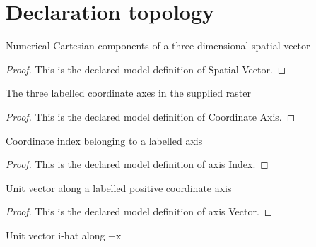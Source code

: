 \section{Declaration topology}
\begin{definition}
  \label{def:physics:phyx-mini-0792:phyxminiproblems-problemphyxmini0792-spatialvector}
  Numerical Cartesian components of a three-dimensional spatial vector
\end{definition}
\begin{proof}
  This is the declared model definition of Spatial Vector.
\end{proof}
\begin{definition}
  \label{def:physics:phyx-mini-0792:phyxminiproblems-problemphyxmini0792-coordinateaxis}
  The three labelled coordinate axes in the supplied raster
\end{definition}
\begin{proof}
  This is the declared model definition of Coordinate Axis.
\end{proof}
\begin{definition}
  \label{def:physics:phyx-mini-0792:phyxminiproblems-problemphyxmini0792-axisindex}
  Coordinate index belonging to a labelled axis
\end{definition}
\begin{proof}
  This is the declared model definition of axis Index.
\end{proof}
\begin{definition}
  \label{def:physics:phyx-mini-0792:phyxminiproblems-problemphyxmini0792-axisvector}
  Unit vector along a labelled positive coordinate axis
\end{definition}
\begin{proof}
  This is the declared model definition of axis Vector.
\end{proof}
\begin{definition}[i Hat]
  \label{def:physics:phyx-mini-0792:phyxminiproblems-problemphyxmini0792-ihat}
  Unit vector i-hat along +x
\end{definition}
